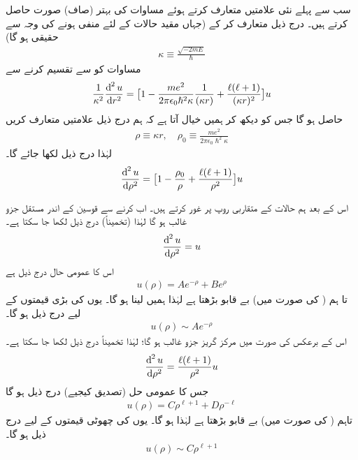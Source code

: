  سب سے پہلے نئی علامتیں متعارف کرتے ہوئے مساوات کی بہتر (صاف) صورت حاصل کرتے ہیں۔ درج ذیل متعارف کر کے (جہاں مقید حالات کے لئے  منفی ہونے کی وجہ سے   حقیقی ہو گا)
 \begin{align}\label{مساوات_ابعادی_متعارف_الف}
\kappa \equiv \frac{\sqrt{-2mE}}{\hslash} 
\end{align}
 مساوات  کو  سے تقسیم کرنے سے
\begin{align*}
\frac{1}{\kappa ^{2}}\frac{\dif^{\,2}{u}}{\dif{r^{2}}}=\big[1-\frac{me^{2}}{2\pi\epsilon_{0}\hslash^{2}\kappa }\frac{1}{(\kappa r)}+\frac{\ell(\ell+1)}{(\kappa r)^{2}}\big]u 
\end{align*}
حاصل ہو گا جس کو دیکھ کر ہمیں خیال آتا ہے کہ ہم درج ذیل علامتیں متعارف کریں 
\begin{align}\label{مساوات_ابعادی_متعارف_ب}
\rho\equiv \kappa r, \quad \rho_{0}\equiv\frac{me^{2}}{2\pi\epsilon_{0}\hslash^{2}\kappa } 
\end{align}
لہٰذا درج ذیل لکھا جائے گا۔
\begin{align}\label{مساوات_ابعادی_رداسی_کولمب_نئے_متغیرات}
\frac{\dif^{\,2}{u}}{\dif{\rho^{2}}}=\big[1-\frac{\rho_{0}}{\rho}+\frac{\ell(\ell+1)}{\rho^{2}}\big]u 
\end{align}

اس کے بعد ہم حالات کے  متقاربی روپ پر غور کرتے ہیں۔ اب  کرنے سے قوسین کے اندر مستقل جزو غالب ہو گا لہٰذا (تخمیناً) درج ذیل لکھا جا سکتا ہے۔
\begin{align*}
\frac{\dif^{\,2}{u}}{\dif{\rho^{2}}}=u 
\end{align*}
اس کا عمومی حال درج ذیل ہے
\begin{align}\label{مساوات_ابعاد_عمومی_حل_بے_قابو}
u(\rho)=Ae^{-\rho}+Be^{\rho} 
\end{align}
تا ہم  ( کی صورت میں)  بے قابو بڑھتا ہے لہٰذا ہمیں  لینا ہو گا۔ یوں  کی بڑی قیمتوں کے لیے درج  ذیل ہو گا۔
\begin{align}
u(\rho)\sim Ae^{-\rho} 
\end{align}
اس کے برعکس  کی صورت میں مرکز گریز جزو غالب ہو گا؛ لہٰذا تخمیناً  درج ذیل لکھا جا سکتا ہے۔ 
\begin{align*}
\frac{\dif^{\,2}{u}}{\dif{\rho^{2}}}=\frac{\ell(\ell+1)}{\rho^{2}}u 
\end{align*}
 جس کا عمومی حل (تصدیق کیجیے) درج ذیل ہو گا
 \begin{align*}
u(\rho)=C\rho^{\ell+1}+D\rho^{-\ell} 
\end{align*}
 تاہم  (  کی صورت میں)    بے قابو بڑھتا ہے لہٰذا   ہو گا۔ یوں    کی چھوٹی قیمتوں کے لیے درج ذیل ہو گا۔
 \begin{align}\label{مساوات_ابعادی_ہائیڈروجن_مبدا_قریب}
u(\rho)\sim C\rho^{\ell+1} 
\end{align}

